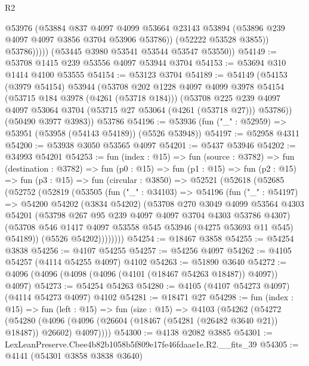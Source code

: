 \begin{lexlean}{R2}
\begin{coremodule}
                  @53976
                  (@53884
                    @837
                    @4097
                    @4099
                    @53664
                    @23143
                    @53894
                    (@53896 @239 @4097 @4097 @3856 @3704 @53906 @53786))
                  (@52222 @53528 @3855))
                @53786)))))
      (@53445 @3980 @53541 @53544 @53547 @53550))
@54149 := @53708 @1415 @239 @53556 @4097 @53944 @3704
@54153 := @53694 @310 @1414 @4100 @53555
@54154 := @53123 @3704
@54189 := @54149
    (@54153
      (@3979 @54154)
      @53944
      (@53708
        @202
        @1228
        @4097
        @4099
        @3978
        @54154
        (@53715 @184 @3978 (@4261 (@53718 @184)))
        (@53708 @225 @239 @4097 @4097 @53064 @3704 (@53715 @27 @53064 (@4261 (@53718 @27))) @53786))
      (@50490 @3977 @3983))
    @53786
@54196 := @53936 (fun ("_" : @52959) => @53951 (@53958 (@54143 @54189)) (@5526 @53948))
@54197 := @52958 @4311
@54200 := @53938 @3050 @53565 @4097
@54201 := @5437 @53946
@54202 := @34993 @54201
@54253 := fun (index : @15) =>
  fun (source : @3782) =>
  fun (destination : @3782) =>
  fun (p0 : @15) =>
  fun (p1 : @15) =>
  fun (p2 : @15) =>
  fun (p3 : @15) =>
  fun (circular : @3850) =>
  @52521
    (@52618
      (@52685
        (@52752
          (@52819
            (@53505
              (fun ("_" : @34103) =>
              @54196
                (fun ("_" : @54197) =>
                @54200
                  @54202
                  (@3834 @54202)
                  (@53708
                    @270
                    @3049
                    @4099
                    @53564
                    @4303
                    @54201
                    (@53798 @267 @95 @239 @4097 @4097 @3704 @4303 @53786 @4307)
                    (@53708 @546 @1417 @4097 @53558 @545 @53946 (@4275 @53693 @11 @545) @54189))
                  (@5526 @54202))))))))
@54254 := @18467 @3858
@54255 := @54254 @3838
@54256 := @4107 @54255
@54257 := @54256 @4097
@54262 := @4105 @54257 (@4114 @54255 @4097) @4102
@54263 := @51890 @3640
@54272 := @4096 (@4096 (@4098 (@4096 (@4101 (@18467 @54263 @18487)) @4097)) @4097)
@54273 := @54254 @54263
@54280 := @4105 (@4107 @54273 @4097) (@4114 @54273 @4097) @4102
@54281 := @18471 @27
@54298 := fun (index : @15) =>
  fun (left : @15) =>
  fun (size : @15) =>
  @4103
    (@54262
      (@54272
        (@54280 (@4096 (@4096 (@26604 (@18467 (@54281 (@26482 @3640 @21)) @18487)) @26602) @4097))))
@54300 := @4138 @2082 @3885
@54301 := LexLeanPreserve.Cbee4b82b1058b5f809e17fe46fdaae1e.R2.__fits_39
@54305 := @4141 (@54301 @3858 @3838 @3640)

\end{coremodule}
\end{lexlean}
